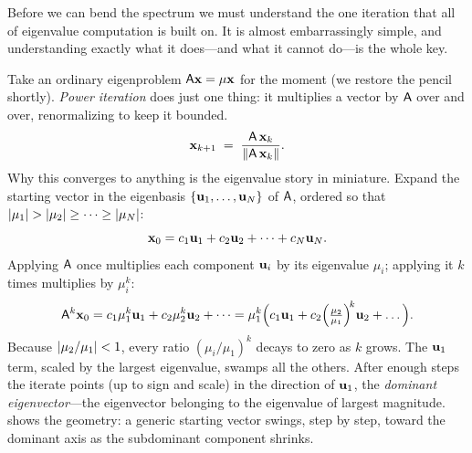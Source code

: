 Before we can bend the spectrum we must understand the one iteration that all of
eigenvalue computation is built on. It is almost embarrassingly simple, and
understanding exactly what it does---and what it cannot do---is the whole key.

Take an ordinary eigenproblem $\mathsf{A}\mathbf{x}=\mu\mathbf{x}$ for the moment (we restore the
pencil shortly). \emph{Power iteration} does just one thing: it multiplies a
vector by $\mathsf{A}$ over and over, renormalizing to keep it bounded.
\begin{equation}
  \mathbf{x}_{k+1} \;=\; \frac{\mathsf{A}\,\mathbf{x}_k}{\lVert\mathsf{A}\,\mathbf{x}_k\rVert}.
  \label{eq:power-step}
\end{equation}
Why this converges to anything is the eigenvalue story in miniature. Expand the
starting vector in the eigenbasis $\{\mathbf{u}_1,\dots,\mathbf{u}_N\}$ of $\mathsf{A}$, ordered so
that $\lvert\mu_1\rvert>\lvert\mu_2\rvert\ge\dots\ge\lvert\mu_N\rvert$:
\begin{equation}
  \mathbf{x}_0 = c_1\mathbf{u}_1 + c_2\mathbf{u}_2 + \dots + c_N\mathbf{u}_N .
\end{equation}
Applying $\mathsf{A}$ once multiplies each component $\mathbf{u}_i$ by its eigenvalue
$\mu_i$; applying it $k$ times multiplies by $\mu_i^k$:
\begin{equation}
  \mathsf{A}^k\mathbf{x}_0
    = c_1\mu_1^k\mathbf{u}_1 + c_2\mu_2^k\mathbf{u}_2 + \dots
    = \mu_1^k\Bigl(c_1\mathbf{u}_1
        + c_2\Bigl(\tfrac{\mu_2}{\mu_1}\Bigr)^{\!k}\mathbf{u}_2 + \dots\Bigr).
  \label{eq:power-expand}
\end{equation}
Because $\lvert\mu_2/\mu_1\rvert<1$, every ratio $(\mu_i/\mu_1)^k$ decays to zero as
$k$ grows. The $\mathbf{u}_1$ term, scaled by the largest eigenvalue, swamps all the
others. After enough steps the iterate points (up to sign and scale) in the
direction of $\mathbf{u}_1$, the \emph{dominant eigenvector}---the eigenvector belonging
to the eigenvalue of largest magnitude.  shows the
geometry: a generic starting vector swings, step by step, toward the dominant
axis as the subdominant component shrinks.

